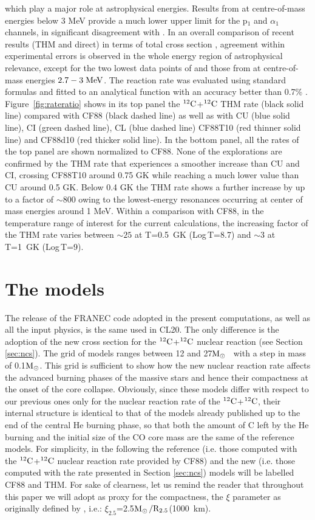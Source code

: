 \documentclass{aastex631}
\newcommand{\msun}{$\rm M_\odot$}
\newcommand\nuk[2]{$\rm ^{\rm #2} #1$}
\begin{document}
which play a major role at astrophysical energies. Results from \citet{ta20} at centre-of-mass energies below 3 MeV provide a much lower upper limit for the p$_1$ and $\alpha_1$ channels, in significant disagreement with \citet{fr20}. In an overall comparison of recent results (THM and direct) in terms of total cross section \citep{tumino21}, agreement within experimental errors is observed in the whole energy region of astrophysical relevance, except for the two lowest data points of \citet{Spillane07} and those from \citet{ta20} at centre-of-mass energies $2.7 - 3\; {\rm MeV}$. The reaction rate was evaluated using standard formulas and fitted to an analytical function with an accuracy better than 0.7\% \citep{thm18}. Figure~\ref{fig:rateratio} shows in its top panel the \nuk{C}{12}+\nuk{C}{12} THM rate (black solid line) compared with CF88 (black dashed line) as well as with CU (blue solid line), CI (green dashed line), CL (blue dashed line) CF88T10 (red thinner solid line) and CF88d10 (red thicker solid line). In the bottom panel, all the rates of the top panel are shown normalized to CF88. None of the explorations are confirmed by the THM rate that experiences a smoother increase than CU and CI, crossing CF88T10 around 0.75 GK while reaching a much lower value than CU around 0.5 GK. Below 0.4 GK the THM rate shows a further increase by up to a factor of $\sim$800 owing to the lowest-energy resonances occurring at center of mass energies around 1 MeV. Within a comparison with CF88, in the temperature range of interest for the current calculations, the increasing factor of the THM rate varies between $\sim25$ at T=0.5~GK (Log\,T=8.7) and $\sim3$ at T=1~GK (Log\,T=9).

\section{The models}
The release of the FRANEC code adopted in the present computations, as well as all the input physics, is the same used in CL20. The only difference is the adoption of the new cross section for the \nuk{C}{12}+\nuk{C}{12} nuclear reaction (see Section \ref{sec:ncs}). The grid of models ranges between 12 and 27\msun~ with a step in mass of 0.1\msun. This grid is sufficient to show how the new nuclear reaction rate affects the advanced burning phases of the massive stars and hence their compactness at the onset of the core collapse. Obviously, since these models differ with respect to our previous ones only for the nuclear reaction rate of the \nuk{C}{12}+\nuk{C}{12}, their internal structure is identical to that of the models already published up to the end of the central He burning phase, so that both the amount of C left by the He burning and the initial size of the CO core mass are the same of the reference models. For simplicity, in the following the reference (i.e. those computed with the \nuk{C}{12}+\nuk{C}{12} nuclear reaction rate provided by CF88) and the new (i.e. those computed with the rate presented in Section \ref{sec:ncs}) models will be labelled CF88 and THM. 
For sake of clearness, let us remind the reader that throughout this paper we will adopt as proxy for the compactness, the $\xi$ parameter as originally defined by \cite{oo11}, i.e.: $\xi_{2.5}$=2.5\msun$\rm / R_{2.5}$(1000~km).
 
\end{document}
